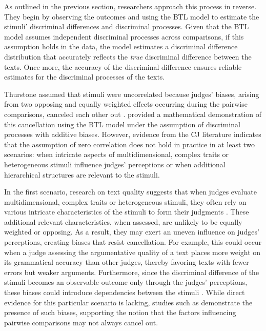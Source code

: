 \documentclass[
  authoryear,
  review,
  1p]{elsarticle}
\begin{document}
As outlined in the previous section, researchers approach this process
in reverse. They begin by observing the outcomes and using the BTL model
to estimate the stimuli' discriminal differences and discriminal
processes. Given that the BTL model assumes independent discriminal
processes across comparisons, if this assumption holds in the data, the
model estimates a discriminal difference distribution that accurately
reflects the \emph{true} discriminal difference between the texts. Once
more, the accuracy of the discriminal difference ensures reliable
estimates for the discriminal processes of the texts.

Thurstone assumed that stimuli were uncorrelated because judges' biases,
arising from two opposing and equally weighted effects occurring during
the pairwise comparisons, canceled each other out
\citep[pp.~268]{Thurstone_1927b}. \citet{Andrich_1978} provided a
mathematical demonstration of this cancellation using the BTL model
under the assumption of discriminal processes with additive biases.
However, evidence from the CJ literature indicates that the assumption
of zero correlation does not hold in practice in at least two scenarios:
when intricate aspects of multidimensional, complex traits or
heterogeneous stimuli influence judges' perceptions or when additional
hierarchical structures are relevant to the stimuli.

In the first scenario, research on text quality suggests that when
judges evaluate multidimensional, complex traits or heterogeneous
stimuli, they often rely on various intricate characteristics of the
stimuli to form their judgments
\citep{vanDaal_et_al_2016, Lesterhuis_2018, Chambers_et_al_2022}. These
additional relevant characteristics, when assessed, are unlikely to be
equally weighted or opposing. As a result, they may exert an uneven
influence on judges' perceptions, creating biases that resist
cancellation. For example, this could occur when a judge assessing the
argumentative quality of a text places more weight on its grammatical
accuracy than other judges, thereby favoring texts with fewer errors but
weaker arguments. Furthermore, since the discriminal difference of the
stimuli becomes an observable outcome only through the judges'
perceptions, these biases could introduce dependencies between the
stimuli \citep[pp.~346]{vanderLinden_et_al_2017_II}. While direct
evidence for this particular scenario is lacking, studies such as
\citet{Pollitt_et_al_2003} demonstrate the presence of such biases,
supporting the notion that the factors influencing pairwise comparisons
may not always cancel out.
\end{document}
